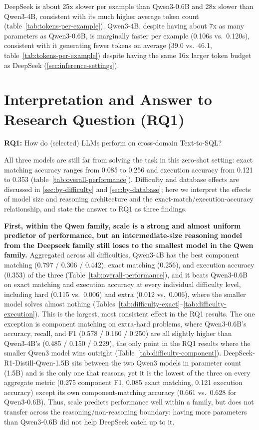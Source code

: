 DeepSeek is about 25x slower per example than Qwen3-0.6B and 28x slower than Qwen3-4B, consistent with its much higher average token count (table~\ref{tab:tokens-per-example}). Qwen3-4B, despite having about 7x as many parameters as Qwen3-0.6B, is marginally faster per example (0.106s vs.\ 0.120s), consistent with it generating fewer tokens on average (39.0 vs.\ 46.1, table~\ref{tab:tokens-per-example}) despite having the same 16x larger token budget as DeepSeek (\ref{sec:inference-settings}).


\section{Interpretation and Answer to Research Question (RQ1)}
\label{sec:rq1-interpretation}

\textbf{RQ1:} How do (selected) LLMs perform on cross-domain Text-to-SQL?

\vspace{10px}

All three models are still far from solving the task in this zero-shot setting: exact matching accuracy ranges from 0.085 to 0.256 and execution accuracy from 0.121 to 0.353 (table~\ref{tab:overall-performance}). Difficulty and database effects are discussed in \ref{sec:by-difficulty} and \ref{sec:by-database}; here we interpret the effects of model size and reasoning architecture and the exact-match/execution-accuracy relationship, and state the answer to RQ1 as three findings.

\textbf{First, within the Qwen family, scale is a strong and almost uniform predictor of performance, but an intermediate-size reasoning model from the Deepseek family still loses to the smallest model in the Qwen family.} Aggregated across all difficulties, Qwen3-4B has the best component matching (0.797 / 0.306 / 0.442), exact matching (0.256), and execution accuracy (0.353) of the three (Table~\ref{tab:overall-performance}), and it beats Qwen3-0.6B on exact matching and execution accuracy at every individual difficulty level, including hard (0.115 vs.\ 0.006) and extra (0.012 vs.\ 0.006), where the smaller model solves almost nothing (Tables~\ref{tab:difficulty-exact}--\ref{tab:difficulty-execution}). This is the largest, most consistent effect in the RQ1 results. The one exception is component matching on extra-hard problems, where Qwen3-0.6B's accuracy, recall, and F1 (0.578 / 0.160 / 0.250) are all slightly higher than Qwen3-4B's (0.485 / 0.150 / 0.229), the only point in the RQ1 results where the smaller Qwen3 model wins outright (Table~\ref{tab:difficulty-component}). DeepSeek-R1-Distill-Qwen-1.5B sits between the two Qwen3 models in parameter count (1.5B) and is the only one that reasons, yet it is the lowest of the three on every aggregate metric (0.275 component F1, 0.085 exact matching, 0.121 execution accuracy) except its own component-matching accuracy (0.661 vs.\ 0.628 for Qwen3-0.6B). Thus, scale predicts performance well within a family, but does not transfer across the reasoning/non-reasoning boundary: having more parameters than Qwen3-0.6B did not help DeepSeek catch up to it.

